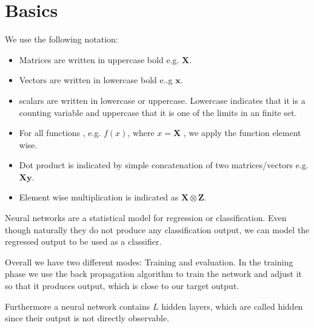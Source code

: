 \documentclass{acm_proc_article-sp}
\begin{document}








\section{Basics}


We use the following notation:
\begin{itemize}
\item Matrices are written in uppercase bold e.g. $\mathbf{X}$.
\item Vectors are written in lowercase bold e..g $\mathbf{x}$.
\item scalars are written in lowercase or uppercase. Lowercase indicates that it is a counting variable and uppercase that it is one of the limits in an finite set.
\item For all functions , e.g. $f(x)$, where $x = \mathbf{X}$ , we apply the function element wise.
\item Dot product is indicated by simple concatenation of two matrices/vectors e.g. $\mathbf{X} \mathbf{y}$.
\item Element wise multiplication is indicated as $\mathbf{X} \otimes \mathbf{Z}$.
\end{itemize}

Neural networks are a statistical model for regression or classification. Even though naturally they do not produce any classification output, we can model the regressed output to be used as a classifier. 

Overall we have two different modes: Training and evaluation. In the training phase we use the back propagation algorithm to train the network and adjust it so that it produces output, which is close to our target output.

Furthermore a neural network contains $L$ hidden layers, which are called hidden since their output is not directly observable.
\end{document}
